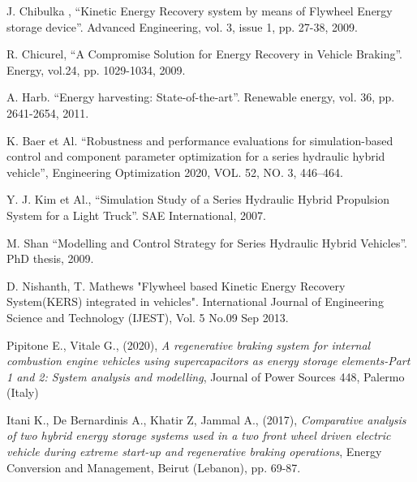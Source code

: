 \documentclass[11pt]{article}
\begin{document}
\begin{thebibliography}{60}
	
	
	
	
	
	J. Chibulka , “Kinetic Energy Recovery system by means of Flywheel Energy 		    storage device”. 
	Advanced Engineering, vol. 3, issue 1, pp. 27-38, 2009.
	
	R. Chicurel, “A Compromise Solution for Energy Recovery in Vehicle Braking”.      	Energy, vol.24, pp. 1029-1034, 2009.
	
	A. Harb. “Energy harvesting: State-of-the-art”. 
	Renewable energy, vol. 36, pp. 2641-2654, 2011.
	
	K. Baer et Al. “Robustness and performance evaluations for simulation-based 		control and component parameter optimization for a series hydraulic hybrid 			vehicle”,  Engineering Optimization 2020, VOL. 52, NO. 3, 446–464.	
	
	Y. J. Kim et Al., “Simulation Study of a Series Hydraulic Hybrid Propulsion 		System for a Light Truck”. SAE International, 2007.
	
	M. Shan “Modelling and Control Strategy for Series Hydraulic Hybrid 				Vehicles”.  PhD thesis, 2009.
	
	D. Nishanth, T. Mathews "Flywheel based Kinetic Energy Recovery System(KERS) 	    integrated in vehicles". International Journal of Engineering Science and      	Technology (IJEST), Vol. 5 No.09 Sep 2013.
	
	Pipitone E., Vitale G., (2020), \textit{A regenerative braking system for 			internal combustion engine vehicles using supercapacitors as energy storage 		elements-Part 1 and 2: System analysis and modelling}, Journal of Power 			Sources 448, Palermo (Italy)     	
	
	Itani K., De Bernardinis A., Khatir Z, Jammal A., (2017),  							\textit{Comparative analysis of two hybrid energy storage systems used in a 		two front wheel driven electric vehicle during extreme start-up and 				regenerative braking operations},  Energy Conversion and Management, Beirut 		(Lebanon), pp. 69-87.
	

\end{thebibliography}
\end{document}
